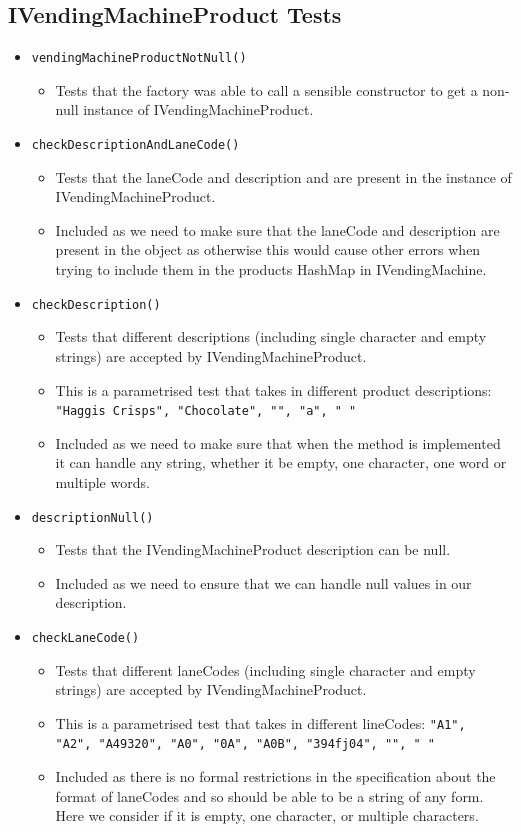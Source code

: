 \documentclass{article}
\begin{document}
\subsection{IVendingMachineProduct Tests}
\begin{itemize}
\item \verb+vendingMachineProductNotNull()+
\begin{itemize}
\item Tests that the factory was able to call a sensible constructor to get a non-null instance of IVendingMachineProduct.
\end{itemize}

\item \verb+checkDescriptionAndLaneCode()+
\begin{itemize}
\item Tests that the laneCode and description and are present in the instance of IVendingMachineProduct.
\item Included as we need to make sure that the laneCode and description are present in the object as otherwise this would cause other errors when trying to include them in the products HashMap in IVendingMachine.
\end{itemize}

\item \verb+checkDescription()+
\begin{itemize}
\item Tests that different descriptions (including single character and empty strings) are accepted by IVendingMachineProduct.
\item This is a parametrised test that takes in different product descriptions: \verb+"Haggis Crisps", "Chocolate", "", "a", " "+
\item Included as we need to make sure that when the method is implemented it can handle any string, whether it be empty, one character, one word or multiple words.
\end{itemize}

\item \verb+descriptionNull()+
\begin{itemize}
\item Tests that the IVendingMachineProduct description can be null.
\item Included as we need to ensure that we can handle null values in our description.
\end{itemize}

\item \verb+checkLaneCode()+
\begin{itemize}
\item Tests that different laneCodes (including single character and empty strings) are accepted by IVendingMachineProduct.
\item This is a parametrised test that takes in different lineCodes: \verb+"A1",+ \\ \verb+"A2", "A49320", "A0", "0A", "A0B", "394fj04", "", " "+
\item Included as there is no formal restrictions in the specification about the format of laneCodes and so should be able to be a string of any form. Here we consider if it is empty, one character, or multiple characters.
\end{itemize}


\end{itemize}
\end{document}
